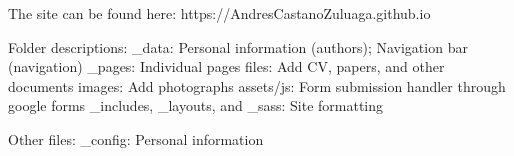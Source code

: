 The site can be found here: https://AndresCastanoZuluaga.github.io

Folder descriptions:
_data: Personal information (authors); Navigation bar (navigation)
_pages: Individual pages
files: Add CV, papers, and other documents
images: Add photographs
assets/js: Form submission handler through google forms
_includes, _layouts, and _sass: Site formatting

Other files:
_config: Personal information
